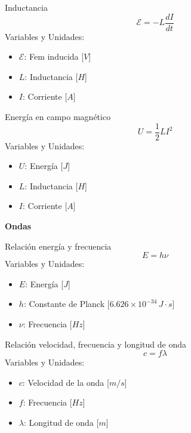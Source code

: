 \begin{landscape}
\begin{multicols}{3}
\begin{teorema}{Inductancia}
    $$\mathcal{E} = -L \frac{dI}{dt}$$
    Variables y Unidades:
    \begin{itemize}
        \item $\mathcal{E}$: Fem inducida [$V$]
        \item $L$: Inductancia [$H$]
        \item $I$: Corriente [$A$]
    \end{itemize}
\end{teorema}

\begin{teorema}{Energía en campo magnético}
    $$U = \frac{1}{2} L I^2$$
    Variables y Unidades:
    \begin{itemize}
        \item $U$: Energía [$J$]
        \item $L$: Inductancia [$H$]
        \item $I$: Corriente [$A$]
    \end{itemize}
\end{teorema}

\end{multicols}

\newpage

\begin{center}
    \LARGE \textbf{Ondas}
\end{center}

\begin{multicols}{3}

\begin{teorema}{Relación energía y frecuencia}
    $$E = h \nu$$
    Variables y Unidades:
    \begin{itemize}
        \item $E$: Energía [$J$]
        \item $h$: Constante de Planck [$6.626 \times 10^{-34} \, J \cdot s$]
        \item $\nu$: Frecuencia [$Hz$]
    \end{itemize}
\end{teorema}

\begin{teorema}{Relación velocidad, frecuencia y longitud de onda}
    $$c = f \lambda$$
    Variables y Unidades:
    \begin{itemize}
        \item $c$: Velocidad de la onda [$m/s$]
        \item $f$: Frecuencia [$Hz$]
        \item $\lambda$: Longitud de onda [$m$]
    \end{itemize}
\end{teorema}


\end{multicols}
\end{landscape}
